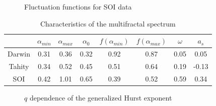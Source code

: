 \documentclass[onecolumn, preprint,aps,amsmath, amssymb, superscriptaddress]{revtex4}
\begin{document}
\begin{figure}
\caption{Fluctuation functions for SOI data}
\label{fig:mfdfa_soi}
\end{figure}






\begin{table}[t]
\begin{center}
\begin{tabular}{ c  c  c  c  c  c  c  c }
\hline

   & $\alpha_{min}$  & $\alpha_{max}$ & $\alpha_0$ & $f(\alpha_{min})$ & $f(\alpha_{max})$ & $\omega$& $a_s$ \\ \hline
Darwin   & 0.31  & 0.36  & 0.32  & 0.92 &  0.87 &  0.05 &  0.05 \\
Tahity     & 0.34  & 0.52  & 0.45  & 0.51 &  0.64 &  0.19 &  -0.13 \\
SOI     & 0.42  & 1.01  & 0.65  & 0.39 &  0.52 &  0.59 &  0.34 \\
\hline
\end{tabular}
\caption{Characteristics of the multifractal spectrum}
\label{tab:mfdfa}
\end{center}
\end{table}


\begin{figure}
\caption{$q$ dependence of the generalized Hurst exponent}
\label{fig:H}
\end{figure}
\end{document}
